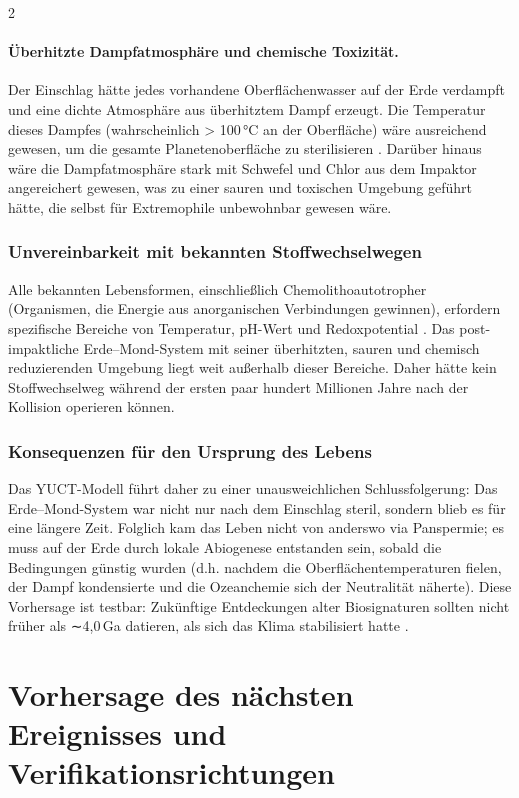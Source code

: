 \documentclass[11pt,a4paper]{article}
\begin{document}
\begin{multicols}{2}
		\paragraph{Überhitzte Dampfatmosphäre und chemische Toxizität.}
		Der Einschlag hätte jedes vorhandene Oberflächenwasser auf der Erde verdampft und eine dichte Atmosphäre aus überhitztem Dampf erzeugt. Die Temperatur dieses Dampfes (wahrscheinlich > 100 °C an der Oberfläche) wäre ausreichend gewesen, um die gesamte Planetenoberfläche zu sterilisieren \cite{Zahnle2015}. Darüber hinaus wäre die Dampfatmosphäre stark mit Schwefel und Chlor aus dem Impaktor angereichert gewesen, was zu einer sauren und toxischen Umgebung geführt hätte, die selbst für Extremophile unbewohnbar gewesen wäre.
		
		\subsubsection{Unvereinbarkeit mit bekannten Stoffwechselwegen}
		
		Alle bekannten Lebensformen, einschließlich Chemolithoautotropher (Organismen, die Energie aus anorganischen Verbindungen gewinnen), erfordern spezifische Bereiche von Temperatur, pH-Wert und Redoxpotential \cite{Chemolithoautotroph}. Das post-impaktliche Erde–Mond-System mit seiner überhitzten, sauren und chemisch reduzierenden Umgebung liegt weit außerhalb dieser Bereiche. Daher hätte kein Stoffwechselweg während der ersten paar hundert Millionen Jahre nach der Kollision operieren können.
		
		\subsubsection{Konsequenzen für den Ursprung des Lebens}
		
		Das YUCT-Modell führt daher zu einer unausweichlichen Schlussfolgerung: Das Erde–Mond-System war nicht nur nach dem Einschlag steril, sondern blieb es für eine längere Zeit. Folglich kam das Leben nicht von anderswo via Panspermie; es muss auf der Erde durch lokale Abiogenese entstanden sein, sobald die Bedingungen günstig wurden (d.h. nachdem die Oberflächentemperaturen fielen, der Dampf kondensierte und die Ozeanchemie sich der Neutralität näherte). Diese Vorhersage ist testbar: Zukünftige Entdeckungen alter Biosignaturen sollten nicht früher als ∼4,0 Ga datieren, als sich das Klima stabilisiert hatte \cite{AbiogenesisReview}.
		
		\section{Vorhersage des nächsten Ereignisses und Verifikationsrichtungen}
		

\end{multicols}
\end{document}
